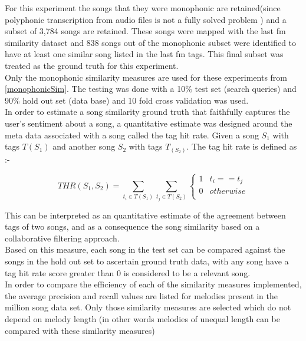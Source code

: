 \noindent For this experiment the songs that they were monophonic are retained(since polyphonic transcription from audio files is not a fully solved problem \cite{melextract}) and a subset of 3,784 songs are retained. These songs were mapped with the last fm similarity dataset and 838 songs out of the monophonic subset were identified to have at least one similar song listed in the last fm tags. This final subset was treated as the ground truth for this experiment. \\

\noindent Only the monophonic similarity measures are used for these experiments from \ref{monophonicSim}. The testing was done with a 10\% test set (search queries) and 90\% hold out set (data base) and 10 fold cross validation was used. \\

\noindent In order to estimate a song similarity ground truth that faithfully captures the user's sentiment about a song, a quantitative estimate was designed around the meta data associated with a song called the tag hit rate. Given a song $S_1$ with tags $T(S_1)$ and another song $S_2$ with tags $T_(S_2)$. The tag hit rate is defined as :-

\begin{equation} \label{taghitrate}
THR(S_1, S_2) = \sum_{t_i \in T(S_1)} \sum_{t_j \in T(S_2)} \begin{cases} 
      1 & t_i == t_j \\
      0 & otherwise \\  \end{cases}
\end{equation}

\noindent This can be interpreted as an quantitative estimate of the agreement between tags of two songs, and as a consequence the song similarity based on a collaborative filtering approach. \\

\noindent Based on this measure, each song in the test set can be compared against the songs in the hold out set to ascertain ground truth data, with any song have a tag hit rate score greater than 0 is considered to be a relevant song. \\

\noindent In order to compare the efficiency of each of the similarity measures implemented, the average precision and recall values are listed for melodies present in the million song data set. Only those similarity measures are selected which do not depend on melody length (in other words melodies of unequal length can be compared with these similarity measures) \\

